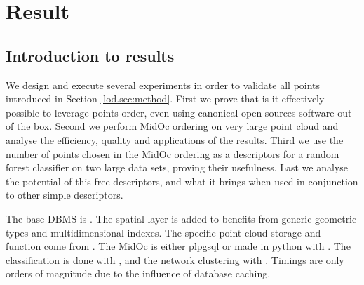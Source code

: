 

 \section{ Result }
	 \label{lod.sec:result}
 	\subsection{Introduction to results}
 		We design and execute several experiments in order to validate all points  introduced in Section \ref{lod.sec:method}.
 		First we prove that is it effectively possible to leverage points order, even using canonical open sources software out of the box.
 		Second we perform MidOc ordering on very large point cloud and analyse the efficiency, quality and applications of the results.
 		Third we use the number of points chosen in the MidOc ordering as a descriptors for a random forest classifier on two large data sets, proving their usefulness.
 		Last we analyse the potential of this free descriptors, and what it brings when used in conjunction to other simple descriptors.
 		
 		The base DBMS is \cite{PostgreSQL2014}. The spatial layer \cite{PostGIS2014} is added to benefits from generic geometric types and multidimensional indexes. The specific point cloud storage and function come from \cite{pgPointCloud2014}. 
 		The MidOc is either plpgsql or made in python with \cite{SciPy2014}. 
 		The classification is done with \cite{scikit-image}, and the network clustering with \cite{Networkx2014}.
 		Timings are only orders of magnitude due to the influence of database caching.
 	
	 
